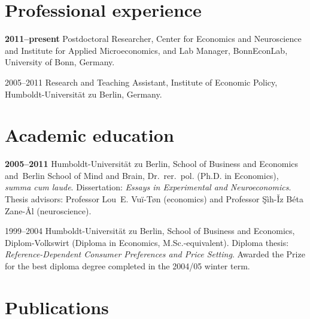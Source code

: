 \documentclass[11pt, a4paper, titleabove]{simplecv}
\newcommand{\caps}[1]{\textscale{0.96}{\addfontfeature{LetterSpace=5}\MakeUppercase{#1}}}
\newcommand{\caps}[1]{\textscale{0.96}{\textls[35]{\MakeUppercase{#1}}}}
\begin{document}
\section{Professional experience}

\begin{topic}

	\item[\textbf{2011--present}]
	Postdoctoral Researcher, Center for Economics and Neuroscience and Institute for Applied Microeconomics, and Lab Manager, Bonn\-Econ\-Lab, University of Bonn, Germany.

	\item[2005--2011]
	Research and Teaching Assistant, Institute of Economic Policy, {Humboldt-Universität zu Berlin,} Germany.

\end{topic}


\section{Academic education}

\begin{topic}

	\item[\textbf{2005--2011}]
	{Humboldt-Universität zu Berlin,} School of Business and Economics and~Berlin School of Mind and Brain, Dr.~rer.~pol. (Ph.D. in Economics), \textit{summa cum laude}. Dissertation: \textit{Essays in Experimental and Neuro\-economics}. Thesis advisors: Professor Lou~E. Vu{\"i}-T{\o}n (economics) and Professor \c{S}{\`i}h-\v{I}z B{\'e}ta Zane-\r{A}l (neuroscience).

	\item[1999--2004]
	{Humboldt-Universität zu Berlin,} School of Business and Economics, {Diplom-Volkswirt} (Diploma in Economics, M.Sc.-equivalent). Diploma thesis: \textit{Reference-Dependent Consumer Preferences and Price Setting}. Awarded the \caps{WWG} Prize for the best diploma degree completed in the 2004/05 winter term.

\end{topic}


\section{Publications}
\end{document}
